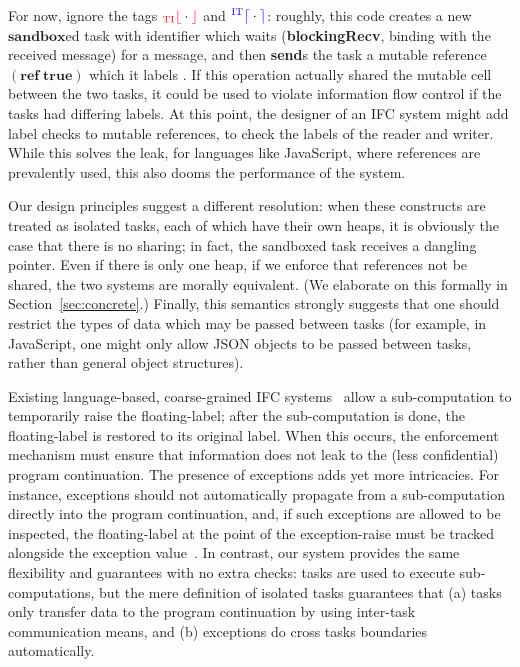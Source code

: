 \documentclass{llncs}
\begin{document}
For now, ignore the tags \ensuremath{\tar{_{\textrm{TI}}\lfloor}\cdot \tar{\rfloor}} and \ensuremath{\ifc{^{\textrm{IT}}\lceil}\cdot \ifc{\rceil}}: roughly, this code creates a new
\ensuremath{\mathbf{sandbox}}ed task with identifier  which waits (\textbf{blockingRecv}, binding  with the received message) for a
message, and then \textbf{send}s the task a mutable reference \ensuremath{(\mathbf{ref}\;\mathbf{true})} which it labels .  If this operation actually shared the mutable cell between the two tasks, it
could be used to violate information flow control if the tasks had
differing labels.  At this point, the designer of an IFC system might
add label checks to mutable references, to check the labels of the
reader and writer. While this solves the leak, for languages like
JavaScript, where references are prevalently used, this also dooms the
performance of the system.

Our design principles suggest a different resolution: when these
constructs are treated as isolated tasks, each of which have their own heaps, it
is obviously the case that there is no sharing; in fact, the sandboxed task receives a dangling pointer.  Even if there is only one heap, if we enforce that references
not be shared, the two systems are morally equivalent. (We elaborate on
this formally in Section~\ref{sec:concrete}.)  Finally, this
semantics strongly suggests that one should restrict the types of
data which may be passed between tasks (for example, in JavaScript, one
might only allow JSON objects to be passed between tasks, rather than
general object structures).

Existing language-based, coarse-grained IFC
systems~\cite{Hritcu:2013:YIB:2497621.2498098,stefan:2012:arxiv-flexible}
allow a sub-computation to temporarily raise the floating-label; after
the sub-computation is done, the floating-label is restored to its
original label. When this occurs, the enforcement mechanism must
ensure that information does not leak to the (less confidential)
program continuation. The presence of exceptions adds yet more
intricacies.  For instance, exceptions should not automatically
propagate from a sub-computation directly into the program
continuation, and, if such exceptions are allowed to be inspected, the
floating-label at the point of the exception-raise must be tracked
alongside the exception
value~\cite{Hritcu:2013:YIB:2497621.2498098,stefan:2012:arxiv-flexible,Hedin:2012}.
In contrast, our system
provides the same flexibility and guarantees with no extra checks: tasks
are used to execute sub-computations, but the mere definition of
isolated tasks guarantees that (a) tasks only transfer data to the
program continuation by using inter-task communication means, and (b)
exceptions do cross tasks boundaries automatically.
\end{document}
